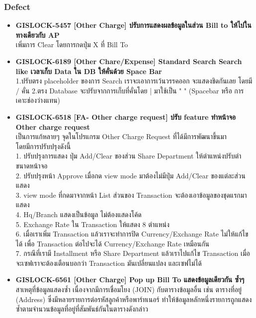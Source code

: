\subsubsection{Defect}
\begin{itemize}
    \setlength\itemsep{1em}
    \item \textbf{{GISLOCK-5457 [Other Charge] ปรับการแสดงผลข้อมูลในส่วน Bill to ให้ไปในทางเดียวกับ AP}} \\
          เพิ่มการ Clear โดยการกดปุ่ม X ที่ Bill To
    \item \textbf{{GISLOCK-6189 [Other Chare/Expense] Standard Search Search like เวลาเก็บ Data ใน DB ให้คั่นด้วย Space Bar}} \\
          1.ปรับตรง placeholder ของการ Search เราจะเอาการเว้นวรรคออก จะแสดงชิดกันเลย โดยมี / คั่น
          2.ตรง Database จะปรับจากการเก็บที่คั่นโดย | มาใช้เป็น " " (Spacebar หรือ การเคาะช่องว่างแทน) 
    \item \textbf{{GISLOCK-6518 [FA- Other charge request] ปรับ feature ทำหน้าจอ Other charge request}} \\
          เป็นการแก้หลายๆ จุดในโปรแกรม Other Charge Request ที่ได้มีการพัฒนาขึ้นมา \\
            โดยมีการปรับปรุงดังนี้ \\
            1. ปรับปรุงการแสดง ปุ่ม Add/Clear ของส่วน Share Department ให้ตำแหน่งปรับตำขนาดหน้าจอ\\
            2. ปรับปรุงหน้า Approve เมื่อกด view mode มาต้องไม่มีปุ่ม Add/Clear ของแต่ละส่วนแสดง \\
            3. view mode ที่กดมาจากหน้า List ส่วนของ Transaction จะต้องเอาข้อมูลของชุดแรกมาแสดง \\
            4. Hq/Branch แสดงเป็นข้อมูล ไม่ต้องแสดงโค้ด \\
            5. Exchange Rate ใน Transaction ให้แสดง 8 ตำแหน่ง \\
            6. เมื่อเราเพิ่ม Transaction แล้วเราจะทำการปิด Currency/Exchange Rate ไม่ให้แก้ไขได้ เพื่อ Transaction ต่อไปจะได้ Currency/Exchange Rate เหมือนกัน\\
            7. กรณีที่เรามี Installment หรือ Share Department แล้วเราไปแก้ไข Transaction เมื่อจะเซฟเราจะต้องเตือนบอกว่า Transaction มันเปลี่ยนแปลง และเซฟไม่ได้ 
    \item \textbf{{GISLOCK-6561 [Other Charge] Pop up \: Bill To แสดงข้อมูลเดียวกัน ซ้ำๆ}} \\
          สาเหตุที่ข้อมูลแสดงซ้ำ เนื่องจากมีการเชื่อมโยง (JOIN) กับตารางข้อมูลอื่น เช่น ตารางที่อยู่ (Address) ซึ่งมีหลายรายการต่อรหัสลูกค้าหรือพาร์ทเนอร์ ทำให้ข้อมูลหลักหนึ่งรายการถูกแสดงซ้ำตามจำนวนข้อมูลที่อยู่ที่สัมพันธ์กันในตารางดังกล่าว \\

\end{itemize}
